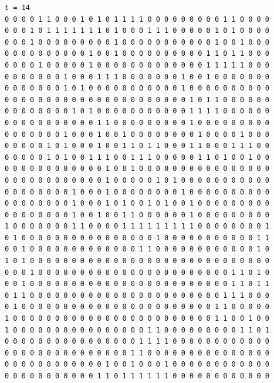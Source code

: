 \documentclass[a4paper,12pt]{article}
\begin{document}
\begin{verbatim}
t = 14
0 0 0 0 1 1 0 0 0 1 0 1 0 1 1 1 1 0 0 0 0 0 0 0 0 0 1 1 0 0 0 0 
0 0 0 1 0 1 1 1 1 1 1 1 0 1 0 0 0 1 1 1 0 0 0 0 0 1 0 1 0 0 0 0 
0 0 0 1 0 0 0 0 0 0 0 0 0 1 0 0 0 0 0 0 0 0 0 0 0 1 0 0 1 0 0 0 
0 0 0 0 0 0 0 0 0 0 1 0 0 1 0 0 0 0 0 0 0 0 0 0 1 1 0 1 1 0 0 0 
0 0 0 0 1 0 0 0 0 0 1 0 0 0 0 0 0 0 0 0 0 0 0 0 1 1 1 1 1 0 0 0 
0 0 0 0 0 0 0 1 0 0 0 1 1 1 0 0 0 0 0 0 0 1 0 0 1 0 0 0 0 0 0 0 
0 0 0 0 0 0 0 1 0 1 0 0 0 0 0 0 0 0 0 0 0 1 0 0 0 0 0 0 0 0 0 0 
0 0 0 0 0 0 0 0 0 0 0 0 0 0 0 0 0 0 0 0 0 0 1 0 1 1 0 0 0 0 0 0 
0 0 0 0 0 0 0 0 1 0 1 0 0 0 0 0 0 0 0 0 0 0 1 1 1 1 0 0 0 0 0 0 
0 0 0 0 0 0 0 0 0 0 0 1 1 0 0 0 0 0 0 0 0 0 1 0 0 0 0 0 0 0 0 0 
0 0 0 0 0 0 0 1 0 0 0 1 0 0 1 0 0 0 0 0 0 0 0 1 0 0 0 0 1 0 0 0 
0 0 0 0 0 1 0 1 0 0 0 1 0 0 1 1 0 1 1 0 0 0 1 1 0 0 0 1 1 1 0 0 
0 0 0 0 0 1 0 1 0 0 1 1 1 0 0 1 1 1 0 0 0 0 0 1 1 0 1 0 0 1 0 0 
0 0 0 0 0 0 0 0 0 0 0 0 1 0 0 1 0 0 0 0 0 0 0 0 0 0 0 0 0 0 0 0 
0 0 0 0 0 0 0 0 0 0 0 0 1 0 0 0 0 0 1 0 1 0 0 0 0 0 0 0 0 0 0 0 
0 0 0 0 0 0 0 0 1 0 0 0 1 0 0 0 0 0 0 0 0 1 0 0 0 0 0 0 0 0 0 0 
0 0 0 0 0 0 0 0 1 0 0 0 1 0 1 0 0 1 0 1 0 0 1 0 0 0 0 0 0 0 0 0 
0 0 0 0 0 0 0 0 1 0 0 1 0 0 1 1 0 0 0 0 0 0 1 0 0 0 0 0 0 0 0 0 
1 0 0 0 0 0 0 0 1 1 0 0 0 0 1 1 1 1 1 1 1 1 1 0 0 0 0 0 0 0 0 1 
0 1 0 0 0 0 0 0 0 0 0 0 0 0 0 0 0 0 1 0 0 0 0 0 0 0 0 0 0 0 1 1 
0 0 1 0 0 0 0 0 0 0 0 0 0 0 0 0 1 1 0 0 0 0 0 0 0 0 0 0 0 0 1 0 
1 0 1 0 0 0 0 0 0 0 0 0 0 0 0 0 0 0 0 0 0 0 0 0 0 0 0 0 0 0 0 0 
0 0 0 1 0 0 0 0 0 0 0 0 0 0 0 0 0 0 0 0 0 0 0 0 0 0 0 1 1 0 1 0 
0 0 1 0 0 0 0 0 0 0 0 0 0 0 0 0 0 0 0 0 0 0 0 0 0 0 0 1 1 0 1 1 
0 1 1 0 0 0 0 0 0 0 0 0 0 0 0 0 0 0 0 0 0 0 0 0 0 0 1 1 1 0 0 0 
0 1 0 0 0 0 0 0 0 0 0 0 0 0 0 0 0 0 0 0 0 0 0 0 0 1 1 0 0 0 0 0 
1 0 0 0 0 0 0 0 0 0 0 0 0 0 0 0 0 0 0 0 0 0 0 0 0 1 1 0 0 1 0 0 
1 0 0 0 0 0 0 0 0 0 0 0 0 0 0 0 0 1 1 0 0 0 0 0 0 0 0 0 1 1 0 1 
0 0 0 0 0 0 0 0 0 0 0 0 0 0 0 0 1 1 1 1 0 0 0 0 0 0 0 0 0 0 0 0 
0 0 0 0 0 0 0 0 0 0 0 0 0 0 0 1 1 0 0 0 0 0 0 0 0 0 0 0 0 0 0 0 
0 0 0 0 0 0 0 0 0 0 0 0 1 0 0 1 0 0 0 1 0 0 0 0 0 0 0 0 0 0 0 0 
0 0 0 0 0 0 0 0 0 0 0 1 1 0 1 1 1 1 1 1 0 0 0 0 0 0 0 0 0 0 0 0 




\end{verbatim}
\end{document}
